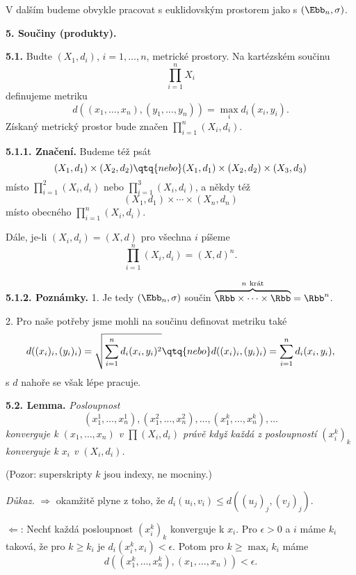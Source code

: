 \documentclass[12pt]{article}
\begin{document}
{ \medskip
 
 V dalším budeme obvykle pracovat s euklidovským prostorem jako s $(\Ebb_n,\sigma)$.
 
 \vskip10mm
 
 {\large\bf 5. Součiny (produkty).}
  
 \bigskip
 
 
 {\bf 5.1.} Budte $(X_1,d_i)$, $i=1,\dots,n$, metrické prostory. Na kartézském součinu
 $$
 \prod_{i=1}^nX_i
 $$
 definujeme metriku
 $$
 d((x_1,\dots,x_n),(y_1,\dots,y_n))=\max_id_i(x_i,y_i).
 $$
Získaný metrický prostor bude značen $\prod_{i=1}^n (X_i,d_i)$.
 
 \medskip
 
 {\bf 5.1.1. Značení.} Budeme též psát
  $$
 (X_1,d_1)\times (X_2,d_2) \qtq{nebo} (X_1,d_1)\times (X_2,d_2)\times (X_3,d_3)
 $$
  místo $\prod_{i=1}^2 (X_i,d_i)$ nebo $\prod_{i=1}^3 (X_i,d_i)$, a někdy též
 $$
 (X_1,d_1)\times \cdots\times  (X_n,d_n)
 $$
 místo obecného
 $\prod_{i=1}^n (X_i,d_i)$.
 
 Dále, je-li $(X_i,d_i)=(X,d)$ pro všechna $i$ píšeme
 $$
  \prod_{i=1}^n (X_i,d_i)=(X,d)^n.
  $$
 
 \medskip
 
 {\bf 5.1.2. Poznámky.} 1. Je tedy $(\Ebb_n,\sigma)$ součin $\overbrace{\Rbb\times\cdots\times\Rbb}^{n\ \text{krát}}=\Rbb^n$.
 
 \smallskip
 
 2. Pro naše potřeby jsme mohli na součinu definovat metriku také
 $$
 d((x_i)_i,(y_i)_i)=\sqrt{\sum_{i=1}^nd_i(x_i,y_i)^2}\qtq{nebo}d((x_i)_i,(y_i)_i)=\sum_{i=1}^nd_i(x_i,y_i),
 $$
 s  $d$ nahoře se však lépe pracuje.
 
 \bigskip
 
 {\bf 5.2. Lemma.} {\em Posloupnost
 $$
 (x_1^1,\dots,x_n^1),(x_1^2,\dots,x_n^2),\dots,(x_1^k,\dots,x_n^k),\dots
 $$
konverguje k $(x_1,\dots,x_n)$ v $\prod (X_i,d_i)$ právě když každá z posloupností $(x_i^k)_k$ konverguje k $x_i$ v $(X_i,d_i)$.}
 
 (Pozor: superskripty $k$ jsou indexy, ne mocniny.)
 
 {\em Důkaz.} $\Rightarrow$ okamžitě plyne z toho, že $d_i(u_i,v_i)\leq d((u_j)_j,(v_j)_j)$.
 
 \smallskip
 
 $\Leftarrow$: Nechť každá posloupnost $(x_i^k)_k$ konverguje k $x_i$. Pro $\epsilon>0$ a $i$ máme 
 $k_i$ taková, že pro $k\geq k_i$ je $d_i(x_i^k,x_i)<\epsilon$. Potom pro $k\geq\max_ik_i$ máme
 $$
 d((x_1^k,\dots,x_n^k),(x_1,\dots,x_n))<\epsilon.
 $$\sq
 
}
\end{document}
